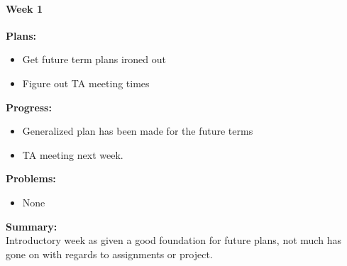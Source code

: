 \paragraph{Week 1}
\begin{adjustwidth}{2.5em}{0pt}
    \vspace{-0.5cm}\textbf{Plans:}
    \vspace{-0.5cm}
    \begin{itemize}
        \item Get future term plans ironed out
		\item Figure out TA meeting times
    \end{itemize} 
    \vspace{-0.3cm}\textbf{Progress:}
    \vspace{-0.5cm}
    \begin{itemize}
        \item Generalized plan has been made for the future terms
        \item TA meeting next week.
    
    \end{itemize} 
    \vspace{-0.3cm}\textbf{Problems:}
    \vspace{-0.5cm}
    \begin{itemize}
        \item None
    \end{itemize}  
    \vspace{-0.3cm}\noindent\textbf{Summary:}\\
    \noindent Introductory week as given a good foundation for future plans, not much has gone on with regards to assignments or project.
	\end{adjustwidth}
